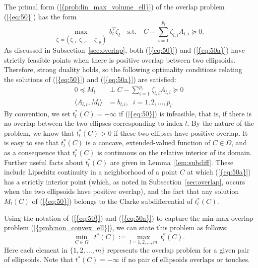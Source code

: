 \documentclass{siamltex}
\begin{document}
The primal form {(\ref{{prob:lin_max_volume_ell}})} of the overlap problem
{(\ref{{eq:50}})} has the form
\begin{equation} \label{eq:50a}
\max_{\zeta_l=(\zeta_{l,1},\zeta_{l,2}, \dotsc, \zeta_{l,p_l})} \, b_l^T\zeta_l \quad \mbox{s.t.} \quad 
C-\sum_{i=1}^{p_l} \zeta_{l,i} A_{l,i}  \succeq 0.
\end{equation}
As discussed in Subsection~\ref{sec:overlap}, both {(\ref{{eq:50}})} and
{(\ref{{eq:50a}})} have strictly feasible points when there is positive
overlap between two ellipsoids. Therefore,  strong duality holds, so
the following optimality conditions relating the solutions of
{(\ref{{eq:50}})} and {(\ref{{eq:50a}})} are satisfied:
\begin{subequations} \label{eq:50kkt}
\begin{align}
\label{eq:50kkt.1}
0 \preceq M_l & \perp C-\sum_{i=1}^{p_l} \zeta_{l,i} A_{l,i}  \succeq 0 \\
\langle A_{l,i},M_l \rangle  & =b_{l,i}, \;\; i=1,2,\dotsc,p_l.
\end{align}
\end{subequations}
By convention, we set $t^*_l(C)=-\infty$ if {(\ref{{eq:50}})} is
infeasible, that is, if there is no overlap between the two ellipses
corresponding to index $l$.  By the nature of the problem, we know
that $t^*_l(C)>0$ if these two ellipses have positive overlap.  It is
easy to see that $t^*_l(C)$ is a concave, extended-valued function of
$C \in \Omega$, and as a consequence that $t^*_l(C)$ is continuous on
the relative interior of its domain.  Further useful facts about
$t^*_l(C)$ are given in Lemma~\ref{lem:subdiff}. These include
Lipschitz continuity in a neighborhood of a point $C$ at which
{(\ref{{eq:50a}})} has a strictly interior point (which, as noted in
Subsection~\ref{sec:overlap}, occurs when the two ellipsoids have
positive overlap), and the fact that any solution $M_l(C)$ of
{(\ref{{eq:50}})} belongs to the Clarke subdifferential of $t^*_l(C)$.

Using the notation of {(\ref{{eq:50}})} and {(\ref{{eq:50a}})} to capture the
min-max-overlap problem {(\ref{{prob:non_convex_ell}})}, we can state this
problem as follows:
\begin{equation} \label{eq:51}
\min_{C \in \Omega} \;\; t^*(C) := 
\max_{l=1,2,\dotsc,m} \, t_l^*(C).
\end{equation}
Here each element in $\{1,2,\dotsc,m\}$ represents the overlap problem
for a given pair of ellipsoids. Note that $t^*(C)=-\infty$ if no pair
of ellipsoids overlaps or touches.
\end{document}
